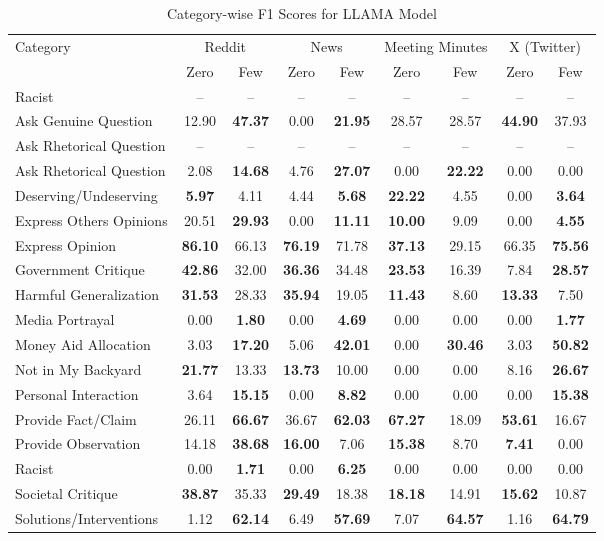 \begin{table*}[htbp]
\centering
\begin{tabular}{l *{8}{c}}
\toprule
Category & \multicolumn{2}{c}{Reddit} & \multicolumn{2}{c}{News} & \multicolumn{2}{c}{Meeting Minutes} & \multicolumn{2}{c}{X (Twitter)} \\
& Zero & Few & Zero & Few & Zero & Few & Zero & Few \\
\midrule
Racist & -- & -- & -- & -- & -- & -- & -- & -- \\
Ask Genuine Question & 12.90 & \textbf{47.37} & 0.00 & \textbf{21.95} & 28.57 & 28.57 & \textbf{44.90} & 37.93 \\
Ask Rhetorical Question & -- & -- & -- & -- & -- & -- & -- & -- \\
Ask Rhetorical Question & 2.08 & \textbf{14.68} & 4.76 & \textbf{27.07} & 0.00 & \textbf{22.22} & 0.00 & 0.00 \\
Deserving/Undeserving & \textbf{5.97} & 4.11 & 4.44 & \textbf{5.68} & \textbf{22.22} & 4.55 & 0.00 & \textbf{3.64} \\
Express Others Opinions & 20.51 & \textbf{29.93} & 0.00 & \textbf{11.11} & \textbf{10.00} & 9.09 & 0.00 & \textbf{4.55} \\
Express Opinion & \textbf{86.10} & 66.13 & \textbf{76.19} & 71.78 & \textbf{37.13} & 29.15 & 66.35 & \textbf{75.56} \\
Government Critique & \textbf{42.86} & 32.00 & \textbf{36.36} & 34.48 & \textbf{23.53} & 16.39 & 7.84 & \textbf{28.57} \\
Harmful Generalization & \textbf{31.53} & 28.33 & \textbf{35.94} & 19.05 & \textbf{11.43} & 8.60 & \textbf{13.33} & 7.50 \\
Media Portrayal & 0.00 & \textbf{1.80} & 0.00 & \textbf{4.69} & 0.00 & 0.00 & 0.00 & \textbf{1.77} \\
Money Aid Allocation & 3.03 & \textbf{17.20} & 5.06 & \textbf{42.01} & 0.00 & \textbf{30.46} & 3.03 & \textbf{50.82} \\
Not in My Backyard & \textbf{21.77} & 13.33 & \textbf{13.73} & 10.00 & 0.00 & 0.00 & 8.16 & \textbf{26.67} \\
Personal Interaction & 3.64 & \textbf{15.15} & 0.00 & \textbf{8.82} & 0.00 & 0.00 & 0.00 & \textbf{15.38} \\
Provide Fact/Claim & 26.11 & \textbf{66.67} & 36.67 & \textbf{62.03} & \textbf{67.27} & 18.09 & \textbf{53.61} & 16.67 \\
Provide Observation & 14.18 & \textbf{38.68} & \textbf{16.00} & 7.06 & \textbf{15.38} & 8.70 & \textbf{7.41} & 0.00 \\
Racist & 0.00 & \textbf{1.71} & 0.00 & \textbf{6.25} & 0.00 & 0.00 & 0.00 & 0.00 \\
Societal Critique & \textbf{38.87} & 35.33 & \textbf{29.49} & 18.38 & \textbf{18.18} & 14.91 & \textbf{15.62} & 10.87 \\
Solutions/Interventions & 1.12 & \textbf{62.14} & 6.49 & \textbf{57.69} & 7.07 & \textbf{64.57} & 1.16 & \textbf{64.79} \\
\bottomrule
\end{tabular}
\centering\caption{Category-wise F1 Scores for LLAMA Model}
\label{tab:llama_category_breakdown}
\end{table*}